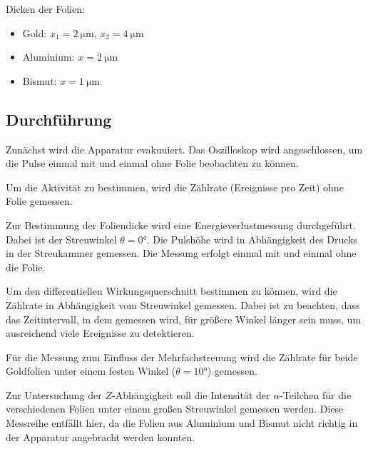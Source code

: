 Dicken der Folien:
\begin{itemize}
  \item Gold: $x_1=\SI{2}{\micro\meter}$, $x_2= \SI{4}{\micro\meter}$
  \item Aluminium: $x=\SI{2}{\micro\meter}$
  \item Bismut: $x=\SI{1}{\micro\meter}$
\end{itemize}


\subsection{Durchführung}
Zunächst wird die Apparatur evakuuiert. Das Oszilloskop wird angeschlossen, um die Pulse einmal mit und einmal ohne Folie beobachten zu können.

Um die Aktivität zu bestimmen, wird die Zählrate (Ereignisse pro Zeit) ohne Folie gemessen.

Zur Bestimmung der Foliendicke wird eine Energieverlustmessung durchgeführt. Dabei ist der Streuwinkel $\theta=0°$. Die Pulshöhe wird in Abhängigkeit des Drucks in der Streukammer gemessen. Die Messung erfolgt einmal mit und einmal ohne die Folie.

Um den differentiellen Wirkungsquerschnitt bestimmen zu können, wird die Zählrate in Abhängigkeit vom Streuwinkel gemessen. Dabei ist zu beachten, dass das Zeitintervall, in dem gemessen wird, für größere Winkel länger sein muss, um ausreichend viele Ereignisse zu detektieren.


Für die Messung zum Einfluss der Mehrfachstreuung wird die Zählrate für beide Goldfolien unter einem festen Winkel ($\theta=10°$) gemessen.

Zur Untersuchung der $Z$-Abhängigkeit soll die Intensität der $\alpha$-Teilchen für die verschiedenen Folien unter einem großen Streuwinkel gemessen werden. Diese Messreihe entfällt hier, da die Folien aus Aluminium und Bismut nicht richtig in der Apparatur angebracht werden konnten.
